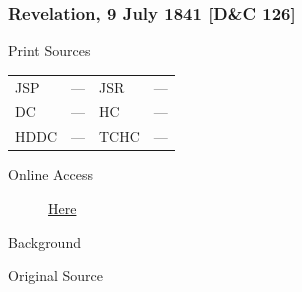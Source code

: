 		\subsubsection{Revelation, 9 July 1841 [D\&C 126]}
			\label{EMS-1841-JS-9-JUL-1841}
				
			\begin{description}
				\item[Print Sources]
			\end{description}

			\begin{tabular}{p{0.5in}p{1in}p{0.5in}p{1in}}
				JSP	 	& ---		& JSR 		& --- \\
				DC	 	& ---		& HC 		& --- \\
				HDDC 	& ---		& TCHC 		& --- \\
			\end{tabular}
			
			\begin{description}
				\item[Online Access] \href{https://www.josephsmithpapers.org/paper-summary/revelation-9july-1841-dc-126/1}{Here}
			\end{description}
			
			\begin{description}
				\item[Background]
			\end{description}
			
			
			\begin{description}
				\item[Original Source]
			\end{description}
			
			
